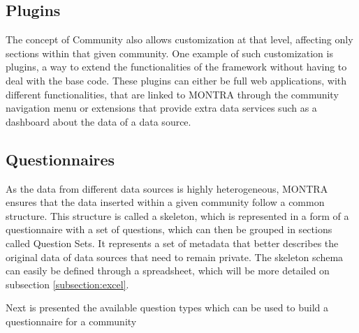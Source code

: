 \subsection*{Plugins}
The concept of Community also allows customization at that level, affecting only sections within that given community.
One example of such customization is plugins, a way to extend the functionalities of the framework without having to deal with the base code.
These plugins can either be full web applications, with different functionalities, that are linked to MONTRA through the community navigation menu or extensions that provide extra data services such as a dashboard about the data of a data source.

\subsection{Questionnaires}

As the data from different data sources is highly heterogeneous, MONTRA ensures that the data inserted within a given community follow a common structure.
This structure is called a skeleton, which is represented in a form of a questionnaire with a set of questions, which can then be grouped in sections called Question Sets.
It represents a set of metadata that better describes the original data of data sources that need to remain private.
The skeleton schema can easily be defined through a spreadsheet, which will be more detailed on subsection \ref{subsection:excel}.

Next is presented the available question types which can be used to build a questionnaire for a community

